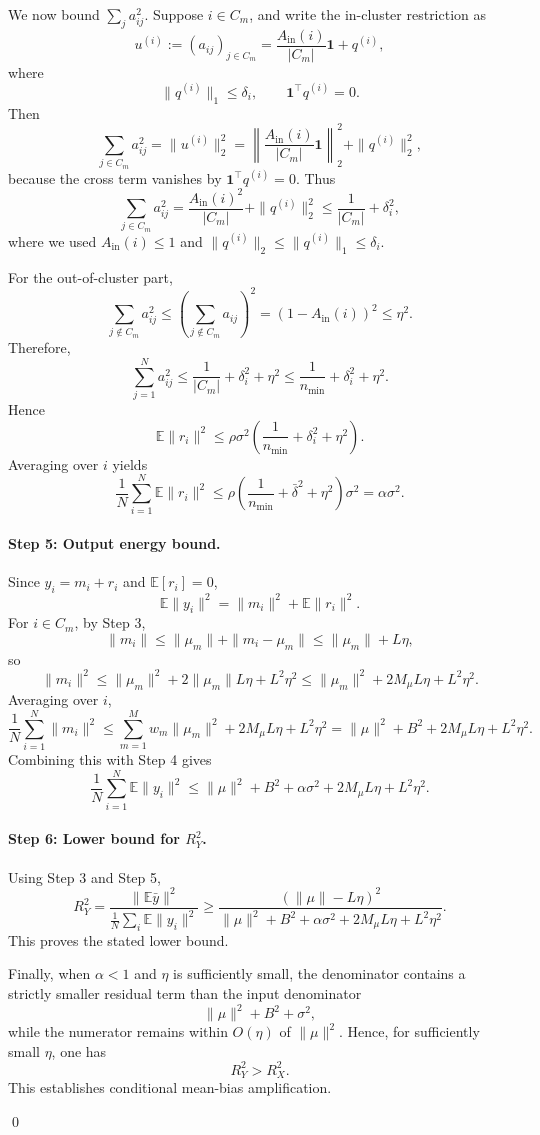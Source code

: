 We now bound $\sum_j a_{ij}^2$.
Suppose $i\in C_m$, and write the in-cluster restriction as
\[
u^{(i)} := (a_{ij})_{j\in C_m}
=
\frac{A_{\mathrm{in}}(i)}{|C_m|}\mathbf{1} + q^{(i)},
\]
where
\[
\|q^{(i)}\|_1 \le \delta_i,
\qquad
\mathbf{1}^\top q^{(i)} = 0.
\]
Then
\[
\sum_{j\in C_m} a_{ij}^2
=
\|u^{(i)}\|_2^2
=
\left\|
\frac{A_{\mathrm{in}}(i)}{|C_m|}\mathbf{1}
\right\|_2^2
+
\|q^{(i)}\|_2^2,
\]
because the cross term vanishes by $\mathbf{1}^\top q^{(i)}=0$.
Thus
\[
\sum_{j\in C_m} a_{ij}^2
=
\frac{A_{\mathrm{in}}(i)^2}{|C_m|}
+
\|q^{(i)}\|_2^2
\le
\frac{1}{|C_m|}
+
\delta_i^2,
\]
where we used $A_{\mathrm{in}}(i)\le 1$ and $\|q^{(i)}\|_2\le \|q^{(i)}\|_1\le \delta_i$.

For the out-of-cluster part,
\[
\sum_{j\notin C_m} a_{ij}^2
\le
\left(\sum_{j\notin C_m} a_{ij}\right)^2
=
(1-A_{\mathrm{in}}(i))^2
\le
\eta^2.
\]
Therefore,
\[
\sum_{j=1}^N a_{ij}^2
\le
\frac{1}{|C_m|} + \delta_i^2 + \eta^2
\le
\frac{1}{n_{\min}} + \delta_i^2 + \eta^2.
\]
Hence
\[
\mathbb{E}\|r_i\|^2
\le
\rho \sigma^2
\left(
\frac{1}{n_{\min}} + \delta_i^2 + \eta^2
\right).
\]
Averaging over $i$ yields
\[
\frac{1}{N}\sum_{i=1}^N \mathbb{E}\|r_i\|^2
\le
\rho
\left(
\frac{1}{n_{\min}} + \bar{\delta}^2 + \eta^2
\right)\sigma^2
=
\alpha \sigma^2.
\]

\paragraph{Step 5: Output energy bound.}

Since $y_i = m_i + r_i$ and $\mathbb{E}[r_i]=0$,
\[
\mathbb{E}\|y_i\|^2
=
\|m_i\|^2 + \mathbb{E}\|r_i\|^2.
\]
For $i\in C_m$, by Step 3,
\[
\|m_i\|
\le
\|\mu_m\| + \|m_i-\mu_m\|
\le
\|\mu_m\| + L\eta,
\]
so
\[
\|m_i\|^2
\le
\|\mu_m\|^2 + 2\|\mu_m\|L\eta + L^2\eta^2
\le
\|\mu_m\|^2 + 2M_\mu L\eta + L^2\eta^2.
\]
Averaging over $i$,
\[
\frac{1}{N}\sum_{i=1}^N \|m_i\|^2
\le
\sum_{m=1}^M w_m \|\mu_m\|^2 + 2M_\mu L\eta + L^2\eta^2
=
\|\mu\|^2 + B^2 + 2M_\mu L\eta + L^2\eta^2.
\]
Combining this with Step 4 gives
\[
\frac{1}{N}\sum_{i=1}^N \mathbb{E}\|y_i\|^2
\le
\|\mu\|^2 + B^2 + \alpha\sigma^2 + 2M_\mu L\eta + L^2\eta^2.
\]

\paragraph{Step 6: Lower bound for $R_Y^2$.}

Using Step 3 and Step 5,
\[
R_Y^2
=
\frac{\|\mathbb{E}\bar{y}\|^2}{\frac{1}{N}\sum_i \mathbb{E}\|y_i\|^2}
\ge
\frac{(\|\mu\|-L\eta)^2}{
\|\mu\|^2 + B^2 + \alpha\sigma^2 + 2M_\mu L\eta + L^2\eta^2 }.
\]
This proves the stated lower bound.

Finally, when $\alpha<1$ and $\eta$ is sufficiently small, the denominator contains a strictly smaller residual term than the input denominator
\[
\|\mu\|^2 + B^2 + \sigma^2,
\]
while the numerator remains within $O(\eta)$ of $\|\mu\|^2$.
Hence, for sufficiently small $\eta$, one has
\[
R_Y^2 > R_X^2.
\]
This establishes conditional mean-bias amplification.

\qed

